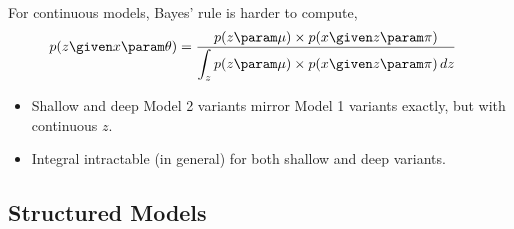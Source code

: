 \begin{frame}
    
    
    For continuous models, Bayes' rule is harder to compute,
\begin{align*}
    p(z \given x \param \theta) 
    &= \frac{\displaystyle p(z \param \mu) \times p(x \given z \param \pi)}{\displaystyle \int_z p(z\param \mu) \times p(x \given z \param \pi) \, dz}
\end{align*}

\air
\air

\pause
\begin{itemize}
    \item Shallow and deep Model 2 variants mirror Model 1 variants exactly, but with continuous $z$.
    \item Integral intractable (in general) for both shallow and deep  variants.
\end{itemize}    
    
\end{frame}

\subsection{Structured Models}

